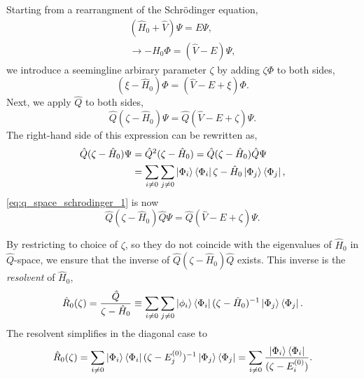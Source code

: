 Starting from a rearrangment of the Schrödinger equation,
\begin{equation}
    \begin{gathered}
        (\hat{H}_0 + \hat{V})\Psi = E\Psi, \\
        \to -\hat{H}_0 \Phi = (\hat{V} - E)\Psi,
    \end{gathered}
\end{equation}
we introduce a seemingline arbirary parameter $\zeta$ by adding $\zeta\Phi$ to both sides,
\begin{equation}
    (\xi - \hat{H}_0)\Phi = (\hat{V} - E + \xi)\Phi.
\end{equation}
Next, we apply $\hat{Q}$ to both sides,
\begin{equation}
    \label{eq:q_space_schrodinger_1} 
    \hat{Q}(\zeta - \hat{H}_0)\Psi = \hat{Q}(\hat{V} - E + \zeta)\Psi.
\end{equation}
The right-hand side of this expression can be rewritten as,
\begin{equation}
    \begin{aligned}
    \hat{Q}(\zeta - \hat{H}_0)\Psi &= \hat{Q}^2(\zeta - \hat{H}_0)
        = \hat{Q}(\zeta - \hat{H}_0)\hat{Q}\Psi \\
        &= \sum_{i \neq 0} \sum_{j \neq 0} \ket{\Phi_i} \bra{\Phi_i}
            \zeta - \hat{H}_0 \ket{\Phi_j} \bra{\Phi_j},
    \end{aligned}
\end{equation}
\autoref{eq:q_space_schrodinger_1} is now 
\begin{equation}
    \label{eq:q_space_schrodinger_2}
    \hat{Q}(\zeta - \hat{H}_0)\hat{Q}\Psi = \hat{Q}(\hat{V} - E + \zeta)\Psi.
\end{equation}

By restricting to choice of $\zeta$, so they do not coincide with the eigenvalues
of $\hat{H}_0$ in $\hat{Q}$-space, we ensure that the inverse of 
$\hat{Q}(\zeta - \hat{H}_0)\hat{Q}$ exists. This inverse is the \emph{resolvent} of
$\hat{H}_0$,
\begin{equation}
    \hat{R}_0(\zeta) = \frac{\hat{Q}}{\zeta - \hat{H}_0}
        \equiv \sum_{i \neq 0} \sum_{j \neq 0}
            \ket{\phi_i}\bra{\Phi_i} 
            (\zeta - \hat{H}_0)^{-1}
            \ket{\Phi_j}\bra{\Phi_j}.
\end{equation}
The resolvent simplifies in the diagonal case to
\begin{equation}
    \hat{R}_0(\zeta)
        = \sum_{i \neq 0} \ket{\Phi_i} \bra{\Phi_i}
            (\zeta - E_j^{(0)})^{-1} \ket{\Phi_j}\bra{\Phi_j}
        = \sum_{i \neq 0} \frac{\ket{\Phi_i} \bra{\Phi_i}}{(\zeta - E_i^{(0)})}. 
\end{equation}

